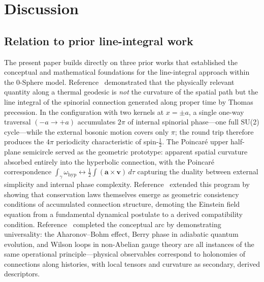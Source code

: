 \documentclass[%
 reprint, amsmath,amssymb, aps, prb, ]{revtex4-2}
\numberwithin{equation}{section}
\begin{document}
\section{Discussion}
\label{sec:discussion}

\subsection{Relation to prior line-integral work}
\label{subsec:lineintegral_prior}

The present paper builds directly on three prior works that established the conceptual and mathematical foundations for the line-integral approach within the 0-Sphere model. Reference~\cite{hanamura29} demonstrated that the physically relevant quantity along a thermal geodesic is \emph{not} the curvature of the spatial path but the line integral of the spinorial connection generated along proper time by Thomas precession. In the configuration with two kernels at $x=\pm a$, a single one-way traversal $(-a\to+a)$ accumulates $2\pi$ of internal spinorial phase---one full SU(2) cycle---while the external bosonic motion covers only $\pi$; the round trip therefore produces the $4\pi$ periodicity characteristic of spin-$\tfrac{1}{2}$. The Poincar\'{e} upper half-plane semicircle served as the geometric prototype: apparent spatial curvature absorbed entirely into the hyperbolic connection, with the Poincar\'{e} correspondence $\int_\gamma\omega_{\mathrm{hyp}}\leftrightarrow\tfrac{1}{2}\int(\mathbf{a}\times\mathbf{v})\,d\tau$ capturing the duality between external simplicity and internal phase complexity. Reference~\cite{hanamura30} extended this program by showing that conservation laws themselves emerge as geometric consistency conditions of accumulated connection structure, demoting the Einstein field equation from a fundamental dynamical postulate to a derived compatibility condition. Reference~\cite{hanamura31} completed the conceptual arc by demonstrating universality: the Aharonov--Bohm effect, Berry phase in adiabatic quantum evolution, and Wilson loops in non-Abelian gauge theory are all instances of the same operational principle---physical observables correspond to holonomies of connections along histories, with local tensors and curvature as secondary, derived descriptors.
\end{document}
